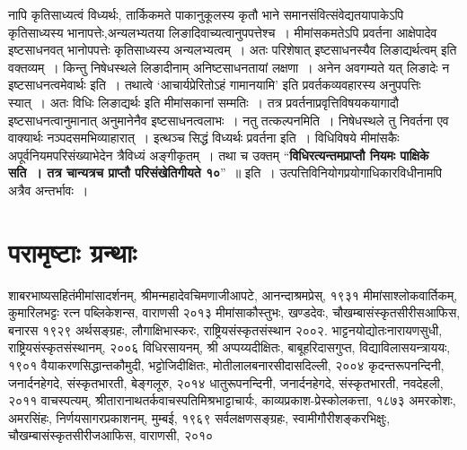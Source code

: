 {नापि कृतिसाध्यत्वं विध्यर्थः, तार्किकमते पाकानुकूलस्य कृतौ भाने समानसंवित्संवेद्यतयापाकेऽपि कृतिसाध्यस्य भानापत्तेः,अन्यलभ्यतया लिङादिवाच्यत्वानुपपत्तेश्च~। मीमांसकमतेऽपि प्रवर्तना आक्षेपादेव इष्टसाधनवत् भानोपपत्तेः कृतिसाध्यस्य अन्यलभ्यत्वम्~। अतः परिशेषात्  इष्टसाधनस्यैव लिङाद्यर्थत्वम् इति वक्तव्यम्~। किन्तु निषेधस्थले लिङादीनाम् अनिष्टसाधनतायां लक्षणा~। अनेन अवगम्यते यत् लिङादेः न इष्टसाधनत्वमेवार्थः इति~। तथात्वे ‘आचार्यप्रेरितोऽहं गामानयामि’ इति प्रवर्तकव्यवहारस्य अनुपपत्तिः स्यात्~। अतः विधिः लिङाद्यर्थः इति मीमांसकानां सम्मतिः~। तत्र प्रवर्तनाप्रवृत्तिविषयकयागादौ इष्टसाधनत्वानुमानात् अनुमानेनैव इष्टसाधनत्वलाभः~। नतु तत्कल्पनमिति~। निषेधस्थले तु निवर्तना एव वाक्यार्थः नञ्पदसमभिव्याहारात्~। इत्थञ्च सिद्धं विध्यर्थः प्रवर्तना इति~।  विधिविषये मीमांसकैः अपूर्वनियमपरिसंख्याभेदेन त्रैविध्यं अङ्गीकृतम्~। तथा च उक्तम् “\textbf{विधिरत्यन्तमप्राप्तौ नियमः पाक्षिके सति~। तत्र चान्यत्रच प्राप्तौ परिसंखेतिगीयते १०}”~॥ इति~। उत्पत्तिविनियोगप्रयोगाधिकारविधीनामपि अत्रैव अन्तर्भावः~। 

\section*{परामृष्टाः ग्रन्थाः}

\begin{thebibliography}{99}
 शाबरभाष्यसहितंमीमांसादर्शनम्, श्रीमन्महादेवचिमणाजीआपटे, आनन्दाश्रमप्रेस्, १९३१
 मीमांसाश्लोकवार्तिकम्, कुमारिलभट्टः रत्न पब्लिकेशन्स, वाराणसी २०१३
 मीमांसाकौस्तुभः, खण्डदेवः, चौखम्बासंस्कृतसीरीसआफिस, बनारस १९२९
 अर्थसङ्ग्रहः, लौगाक्षिभास्करः, राष्ट्रियसंस्कृतसंस्थान २००२.
 भाट्टनयोद्योतःनारायणसुधी, राष्ट्रियसंस्कृतसंस्थानम्, २००६
 विधिरसायनम्, श्री अप्पय्यदीक्षितः, बाबूहरिदासगुप्त, विद्याविलासयन्त्राययः, १९०१
 वैयाकरणसिद्धान्तकौमुदी, भट्टोजिदीक्षितः, मोतीलालबनारसीदासदिल्ली, २००४
 कृदन्तरूपनन्दिनी, जनार्दनहेगदे, संस्कृतभारती, बेङ्गलूरु, २०१४
 धातुरूपनन्दिनी, जनार्दनहेगदे, संस्कृतभारती, नवदेहली, २०११
 वाचस्पत्यम्, श्रीतारानाथतर्कवाचस्पतिमिश्रभाट्टाचार्यः, काव्यप्रकाश-प्रेस्कोलकत्ता, १८७३
 अमरकोशः, अमरसिंहः, निर्णयसागरप्रकाशनम्, मुम्बई, १९६९
 सर्वलक्षणसङ्ग्रहः, स्वामीगौरीशङ्करभिक्षुः, चौखम्बासंस्कृतसीरीजआफिस, वाराणसी, २०१०
 {\fontsize{14}{16}\selectfont {}} 
 {\fontsize{14}{16}\selectfont {}} 
\end{thebibliography}

\articleend
}
